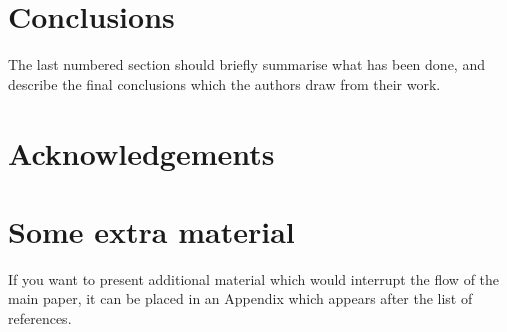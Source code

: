 \documentclass[fleqn,usenatbib]{mnras}
\begin{document}
\section{Conclusions}

The last numbered section should briefly summarise what has been done, and describe
the final conclusions which the authors draw from their work.

\section*{Acknowledgements}











\appendix

\section{Some extra material}

If you want to present additional material which would interrupt the flow of the main paper,
it can be placed in an Appendix which appears after the list of references.



\bsp	%
\label{lastpage}
\end{document}
